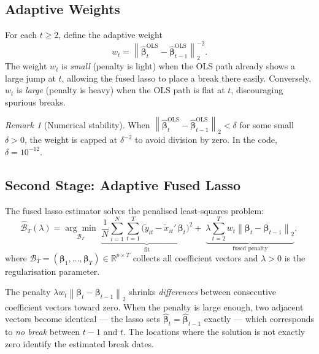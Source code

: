 \documentclass[12pt, a4paper]{article}
\theoremstyle{plain}
\theoremstyle{definition}
\theoremstyle{remark}
\newtheorem{remark}{Remark}[section]
\newcommand{\R}{\mathbb{R}}
\newcommand{\bB}{\mathcal{B}}
\newcommand{\bbeta}{\bm{\beta}}
\newcommand{\norm}[1]{\left\| #1 \right\|}
\begin{document}
\begin{onehalfspacing}
\subsection{Adaptive Weights}
\label{sub:weights}

For each $t \ge 2$, define the adaptive weight
\begin{equation}
  \label{eq:weights}
  w_t = \norm{\hat{\bbeta}_t^{\text{OLS}} - \hat{\bbeta}_{t-1}^{\text{OLS}}}_2^{-2}.
\end{equation}
The weight $w_t$ is \emph{small} (penalty is light) when the OLS path already
shows a large jump at $t$, allowing the fused lasso to place a break there
easily. Conversely, $w_t$ is \emph{large} (penalty is heavy) when the OLS
path is flat at $t$, discouraging spurious breaks.

\begin{remark}[Numerical stability]
  When $\norm{\hat{\bbeta}_t^{\text{OLS}} - \hat{\bbeta}_{t-1}^{\text{OLS}}}_2 < \delta$
  for some small $\delta > 0$, the weight is capped at $\delta^{-2}$ to avoid
  division by zero. In the code, $\delta = 10^{-12}$.
\end{remark}

\subsection{Second Stage: Adaptive Fused Lasso}
\label{sub:fgls}

The fused lasso estimator solves the penalised least-squares problem:
\begin{equation}
  \label{eq:fused_lasso}
  \hat{\bB}_T(\lambda) =
    \underset{\bB_T}{\arg\min} \;
    \underbrace{\frac{1}{N}\sum_{i=1}^N \sum_{t=1}^T
      \bigl(\tilde{y}_{it} - \tilde{x}_{it}'\,\bbeta_t\bigr)^2}_{\text{fit}}
    + \;
    \underbrace{\lambda \sum_{t=2}^T w_t
      \norm{\bbeta_t - \bbeta_{t-1}}_2}_{\text{fused penalty}},
\end{equation}
where $\bB_T = (\bbeta_1, \ldots, \bbeta_T) \in \R^{p \times T}$ collects all
coefficient vectors and $\lambda > 0$ is the regularisation parameter.

\begin{infobox}
  The penalty $\lambda w_t \norm{\bbeta_t - \bbeta_{t-1}}_2$ shrinks
  \emph{differences} between consecutive coefficient vectors toward zero.
  When the penalty is large enough, two adjacent vectors become identical ---
  the lasso sets $\hat{\bbeta}_t = \hat{\bbeta}_{t-1}$ exactly --- which
  corresponds to \emph{no break} between $t-1$ and $t$. The locations where
  the solution is not exactly zero identify the estimated break dates.
\end{infobox}


\end{onehalfspacing}
\end{document}
